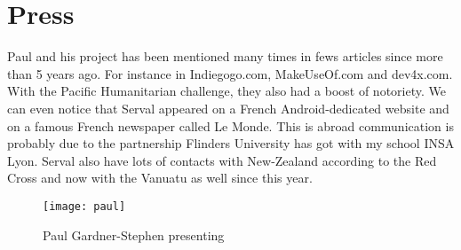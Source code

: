 \section{Press}
Paul and his project has been mentioned many times in fews articles since more than 5 years ago. For instance in Indiegogo.com, MakeUseOf.com and dev4x.com. With the Pacific Humanitarian challenge, they also had a boost of notoriety. We can even notice that Serval appeared on a French Android-dedicated website and on a famous French newspaper called Le Monde. This is abroad communication is probably due to the partnership Flinders University has got with my school INSA Lyon. Serval also have lots of contacts with New-Zealand according to the Red Cross and now with the Vanuatu as well since this year. 

\begin{figure}[h]
\centering
\texttt{[image: paul]}
\caption{Paul Gardner-Stephen presenting}
\end{figure}


